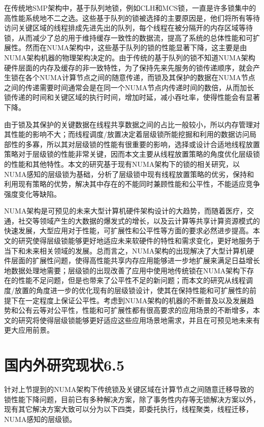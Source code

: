在传统地SMP架构中，基于队列地锁，例如CLH和MCS锁，一直是许多锁集中的高性能系统地不二之选。这些基于队列的锁被选择的主要原因是，他们将所有等待访问关键区域的线程排成先进先出的队列，每个线程在被分隔开的内存区域等待锁，从而减少了总的用于维持缓存一致性的数据流，提高了系统的总体性能和可扩展性。然而在NUMA架构中，这些基于队列的锁的性能显著下降，这主要是由NUMA架构机器的物理架构决定的。由于传统的基于队列的锁不知道NUMA架构硬件层面的内存及缓存的非一致特性，为了保持先来先服务的锁传递顺序，就会产生锁在各个NUMA计算节点之间的随意传递，而锁及其保护的数据在NUMA节点之间的传递需要时间通常会是在同一个NUMA节点内传递时间的数倍，从而加长锁传递的时间和关键区域的执行时间，增加时延，减小吞吐率，使得性能会有显著下降。

由于锁及其保护的关键数据在线程共享数据之间的占比一般较小，所以内存管理对其性能的影响不大；而线程调度/放置决定着层级锁所能挖掘和利用的数据访问局部性的多寡，所以其对层级锁的性能有很重要的影响，选择或设计合适地线程放置策略对于层级锁的性能非常关键，因而本文主要从线程放置策略的角度优化层级锁的性能和其他特性。本文的研究基于现有NUMA架构下的锁的相关研究，以NUMA感知的层级锁为基础，分析了层级锁中现有线程放置策略的优劣，保持和利用现有策略的优势，解决其中存在的不能同时兼顾性能和公平性，不能适应竞争强度变化等缺陷。

NUMA架构是可预见的未来大型计算机硬件架构设计的大趋势，而随着医疗，交通，社交等领域产生的大数据的爆发式的增长，以及云计算等共享计算资源模式的快速发展，大型应用对于性能，可扩展性和公平性等方面的要求必然进步提高。本文的研究使得层级锁能够更好地适应未来软硬件的特性和需求变化，更好地服务于当下和未来相关领域的发展。总而言之，NUMA架构的出现解决了大型计算机硬件层面的扩展性问题，使得高性能共享内存应用能够进一步地扩展来满足日益增长地数据处理地需要；层级锁的出现改善了应用中使用地传统锁在NUMA架构下存在的性能不足问题，但是也带来了公平性不足的新问题；而本文的研究从线程调度/放置的角度进一步的优化现有的层级锁设计，使其在保持性能和可扩展性的前提下在一定程度上保证公平性。考虑到NUMA架构的机器的不断普及以及发展趋势和公有云等对公平性，性能和可扩展性都有很高要求的应用场景的不断增多，本文的研究将使得层级锁能够更好适应这些应用场景地需求，并且在可预见地未来有更大应用前景。
\section{国内外研究现状6.5}
针对上节提到的NUMA架构下传统锁及关键区域在计算节点之间随意迁移导致的锁性能下降问题，目前已有多种解决方案，除了事务性内存等无锁解决方案以外，现有其它解决方案大致可以分为以下四类，即委托执行，线程聚类，线程迁移，NUMA感知的层级锁。
